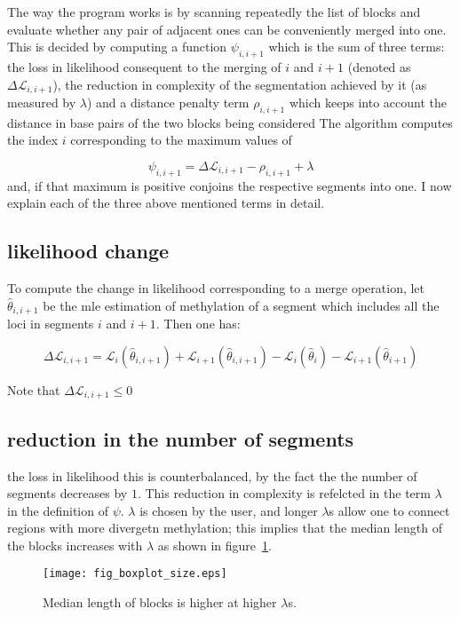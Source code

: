 \documentclass[12pt]{amsart}
\newcommand{\lik}{\ensuremath{\mathcal{L}}}
\begin{document}
The way the program works is by 
scanning repeatedly the list of blocks and evaluate whether any pair 
of adjacent ones can be conveniently merged into one.  
	This is decided by computing a function $\psi_{i,i+1}$ which is the sum of three terms:
the loss in likelihood consequent to the merging of $i$ and $i+1$ (denoted as $\Delta  \lik_{i,i+1}$),
the reduction in complexity of the segmentation achieved by it (as measured by $\lambda$)
and a distance penalty term $\rho_{i,i+1}$ which keeps into account the distance in base pairs of the two blocks
being considered 
The algorithm computes the index $i$ corresponding to the maximum
values of 

\begin{equation}
\psi_{i,i+1} =  \Delta  \lik_{i,i+1}  - \rho_{i,i+1}  +\lambda
\end{equation}
and, if that maximum is positive conjoins the respective segments into one.
I now explain each of the three above mentioned terms in detail.

\subsection{likelihood change}


To compute the change in likelihood corresponding to a merge operation, let 
$\hat{\theta}_{i,i+1}$ be the mle estimation of methylation of 
a segment which includes
all the loci in segments $i$ and $i+1$. Then one has:

\[\Delta  \lik_{i,i+1} = \lik_i(\hat{\theta}_{i,i+1})+
	\lik_{i+1}(\hat{\theta}_{i,i+1}) 
	-\lik_i(\hat{\theta}_{i})
	-\lik_{i+1}(\hat{\theta}_{i+1}) \] 

Note that $\Delta  \lik_{i,i+1} \leq 0$
\subsection{reduction in the number of segments}
the loss in likelihood this is counterbalanced, by the fact the the number 
of segments decreases by $1$. This reduction in complexity is
refelcted in the term $\lambda$ in the definition of $\psi$. $\lambda$
is chosen by the user, and longer $\lambda$s allow one to connect
regions with more divergetn methylation; this implies that the median length of
the blocks increases with $\lambda$ as shown in figure~\ref{fig_boxplot_size}.

\begin{figure}\label{fig_boxplot_size}
\texttt{[image: fig\_boxplot\_size.eps]}
\caption{Median length of blocks is higher at higher $\lambda$s.}
\end{figure}
\end{document}
